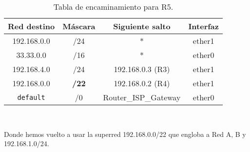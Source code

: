 \begin{ejercicio}
    \begin{table}
        \centering
        \begin{tabular}{|c|c|c|c|}
            \hline
            Red destino & Máscara & Siguiente salto & Interfaz \\
            \hline
            192.168.0.0 & /24 & * & ether1 \\
            \hline
            33.33.0.0 & /16 & * & ether0 \\
            \hline
            192.168.4.0 & /24 & 192.168.0.3 (R3) & ether1 \\
            \hline
            192.168.0.0 & \textbf{/22} & 192.168.0.2 (R4) & ether1 \\
            \hline
            \verb|default| & /0 & Router\_ISP\_Gateway & ether0 \\
            \hline
        \end{tabular}\\
        \caption{Tabla de encaminamiento para R5.}
    \end{table}
    Donde hemos vuelto a usar la superred 192.168.0.0/22 que engloba a Red A, B y 192.168.1.0/24.
\end{ejercicio}

